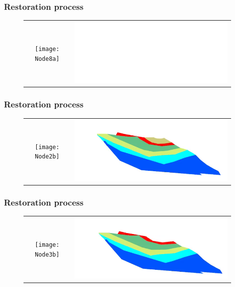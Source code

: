 \documentclass{beamer}
\begin{document}
	\begin{frame}
	\frametitle{Restoration process}
	\begin{figure}[H]
	\centering
	\begin{tabular}{@{}cc@{}}
	\texttt{[image: Node8a]}&
	\includegraphics[width=.65\textwidth]{chartreusedroite10.png}\\
	\end{tabular}
	\end{figure}
	\end{frame}
	
	\begin{frame}
	\frametitle{Restoration process}
	\begin{figure}[H]
	\centering
	\begin{tabular}{@{}cc@{}}
	\texttt{[image: Node2b]}&
	\includegraphics[width=.65\textwidth]{chartreusedroite25.png}\\
	\end{tabular}
	\end{figure}
	\end{frame}
	
	\begin{frame}
	\frametitle{Restoration process}
	\begin{figure}[H]
	\centering
	\begin{tabular}{@{}cc@{}}
	\texttt{[image: Node3b]}&
	\includegraphics[width=.65\textwidth]{chartreusedroite26.png}\\
	\end{tabular}
	\end{figure}
	\end{frame}
	
\end{document}
